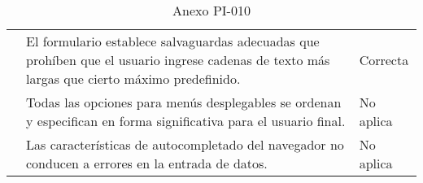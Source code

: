 \begin{table}[htpb]
\begin{tabularx}{\textwidth}{|l|X|l|}
                                       & El formulario establece salvaguardas adecuadas que prohíben que el usuario ingrese cadenas de texto más largas que cierto máximo predefinido.             & Correcta            \\ \cline{2-3} 
                                       & Todas las opciones para menús desplegables se ordenan y especifican en forma significativa para el usuario final.                                         & No aplica           \\ \cline{2-3} 
                                       & Las características de autocompletado del navegador no conducen a errores en la entrada de datos.                                                         & No aplica           \\ \hline
\end{tabularx}
\caption{Anexo PI-010}
\end{table}


